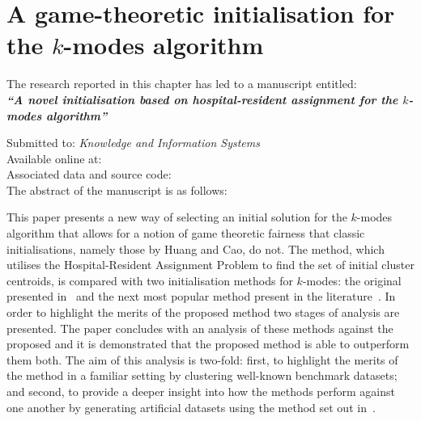 \chapter{A game-theoretic initialisation for the \(k\)-modes algorithm}%
\label{chp:kmodes}

\graphicspath{{chapters/kmodes/paper/img/}}
\renewcommand{\algpath}{chapters/kmodes/paper/tex/algorithms}
\renewcommand{\texpath}{chapters/kmodes/paper/tex}

\begin{center}
    The research reported in this chapter has led to a manuscript
    entitled:\\[.5em]

    {%
        \bf\itshape{``A novel initialisation based on hospital-resident
                    assignment for the \(k\)-modes algorithm''}
    }

    Submitted to: \emph{Knowledge and Information Systems}\\[.5em]

    Available online at: \\
    Associated data and source code:~\\[1em]

    The abstract of the manuscript is as follows:\\[.5em]
\end{center}

This paper presents a new way of selecting an initial solution for the
\(k\)-modes algorithm that allows for a notion of game theoretic fairness that
classic initialisations, namely those by Huang and Cao, do not. The method,
which utilises the Hospital-Resident Assignment Problem to find the set of
initial cluster centroids, is compared with two initialisation methods for
\(k\)-modes: the original presented in~\cite{Huang1998} and the next most
popular method present in the literature~\cite{Cao2009}. In order to highlight
the merits of the proposed method two stages of analysis are presented. The
paper concludes with an analysis of these methods against the proposed and it is
demonstrated that the proposed method is able to outperform them both. The aim
of this analysis is two-fold: first, to highlight the merits of the method in a
familiar setting by clustering well-known benchmark datasets; and second, to
provide a deeper insight into how the methods perform against one another by
generating artificial datasets using the method set out in~\cite{Wilde2020:edo}.

